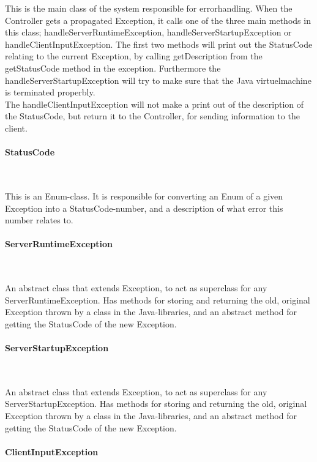 \documentclass[a4paper,10pt,titlepage]{article}
\begin{document}
This is the main class of the system responsible for errorhandling. When the Controller gets a propagated Exception, it calls one of the three main methods in this class; handleServerRuntimeException, handleServerStartupException or handleClientInputException. The first two methods will print out the StatusCode relating to the current Exception, by calling getDescription from the getStatusCode method in the exception. Furthermore the handleServerStartupException will try to make sure that the Java virtuelmachine is terminated properbly.\\
The handleClientInputException will not make a print out of the description of the StatusCode, but return it to the Controller, for sending information to the client.

				\paragraph{StatusCode}\mbox{}\

This is an Enum-class. It is responsible for converting an Enum of a given Exception into a StatusCode-number, and a description of what error this number relates to.
				
				\paragraph{ServerRuntimeException}\mbox{}\

An abstract class that extends Exception, to act as superclass for any ServerRuntimeException. Has methods for storing and returning the old, original Exception thrown by a class in the Java-libraries, and an abstract method for getting the StatusCode of the new Exception.
				
				\paragraph{ServerStartupException}\mbox{}\

An abstract class that extends Exception, to act as superclass for any ServerStartupException. Has methods for storing and returning the old, original Exception thrown by a class in the Java-libraries, and an abstract method for getting the StatusCode of the new Exception.

				\paragraph{ClientInputException}\mbox{}\
\end{document}
